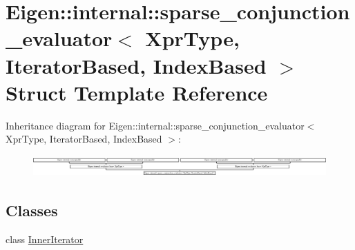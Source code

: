 \hypertarget{struct_eigen_1_1internal_1_1sparse__conjunction__evaluator_3_01_xpr_type_00_01_iterator_based_00_01_index_based_01_4}{}\section{Eigen\+:\+:internal\+:\+:sparse\+\_\+conjunction\+\_\+evaluator$<$ Xpr\+Type, Iterator\+Based, Index\+Based $>$ Struct Template Reference}
\label{struct_eigen_1_1internal_1_1sparse__conjunction__evaluator_3_01_xpr_type_00_01_iterator_based_00_01_index_based_01_4}
Inheritance diagram for Eigen\+:\+:internal\+:\+:sparse\+\_\+conjunction\+\_\+evaluator$<$ Xpr\+Type, Iterator\+Based, Index\+Based $>$\+:\begin{figure}[H]
\begin{center}
\leavevmode
\includegraphics[height=0.828402cm]{struct_eigen_1_1internal_1_1sparse__conjunction__evaluator_3_01_xpr_type_00_01_iterator_based_00_01_index_based_01_4}
\end{center}
\end{figure}
\subsection*{Classes}
\begin{DoxyCompactItemize}
\item 
class \hyperlink{class_eigen_1_1internal_1_1sparse__conjunction__evaluator_3_01_xpr_type_00_01_iterator_based_00_a6ef5c4f649d544c873e35b2b7e6dc62}{Inner\+Iterator}
\end{DoxyCompactItemize}
